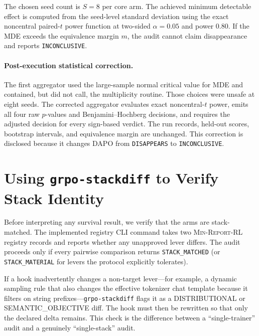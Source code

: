 \documentclass[11pt]{article}
\newcommand{\minreport}{\textsc{Min-Report-RL}}
\begin{document}
The chosen seed count is $S=8$ per core arm. The achieved minimum detectable
effect is computed from the seed-level standard deviation using the exact
noncentral paired-$t$ power function at two-sided $\alpha=0.05$ and power 0.80.
If the MDE exceeds the equivalence margin $m$, the audit cannot claim
disappearance and reports \texttt{INCONCLUSIVE}.

\paragraph{Post-execution statistical correction.} The first aggregator used
the large-sample normal critical value for MDE and contained, but did not call,
the multiplicity routine. Those choices were unsafe at eight seeds. The
corrected aggregator evaluates exact noncentral-$t$ power, emits all four raw
$p$-values and Benjamini--Hochberg decisions, and requires the adjusted decision
for every sign-based verdict. The run records, held-out scores, bootstrap
intervals, and equivalence margin are unchanged. This correction is disclosed
because it changes DAPO from \texttt{DISAPPEARS} to \texttt{INCONCLUSIVE}.

\section{Using \texttt{grpo-stackdiff} to Verify Stack Identity}
\label{sec:stackdiff}

Before interpreting any survival result, we verify that the arms are
stack-matched. The implemented registry CLI command
 \cite{minreportrl2026}
takes two \minreport{} registry records and reports
whether any unapproved lever differs. The audit proceeds only if every pairwise
comparison returns \texttt{STACK\_MATCHED} (or \texttt{STACK\_MATERIAL} for
levers the protocol explicitly tolerates).

If a hook inadvertently changes a non-target lever---for example, a dynamic
sampling rule that also changes the effective tokenizer chat template because
it filters on string prefixes---\texttt{grpo-stackdiff} flags it as a
DISTRIBUTIONAL or SEMANTIC\_OBJECTIVE diff. The hook must then be rewritten so
that only the declared delta remains. This check is the difference between a
``single-trainer'' audit and a genuinely ``single-stack'' audit.
\end{document}
